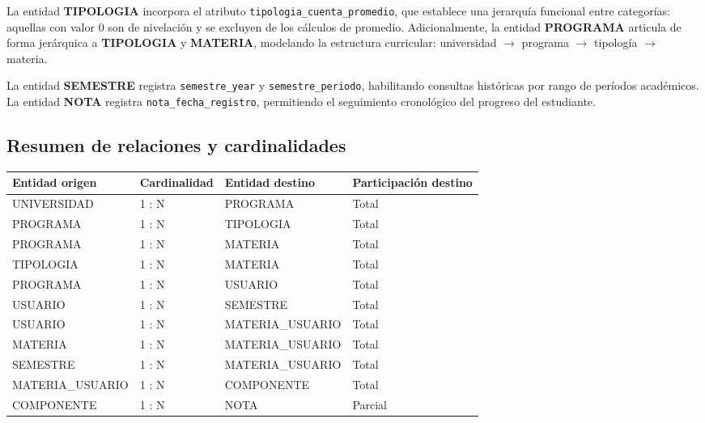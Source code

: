 \documentclass[12pt, letterpaper, twoside]{article}
\begin{document}
La entidad \textbf{TIPOLOGIA} incorpora el atributo \texttt{tipologia\_cuenta\_promedio},
que establece una jerarquía funcional entre categorías: aquellas con valor 0 son de
nivelación y se excluyen de los cálculos de promedio. Adicionalmente, la entidad
\textbf{PROGRAMA} articula de forma jerárquica a \textbf{TIPOLOGIA} y \textbf{MATERIA},
modelando la estructura curricular: universidad $\rightarrow$ programa $\rightarrow$
tipología $\rightarrow$ materia.

La entidad \textbf{SEMESTRE} registra \texttt{semestre\_year} y \texttt{semestre\_periodo},
habilitando consultas históricas por rango de períodos académicos. La entidad
\textbf{NOTA} registra \texttt{nota\_fecha\_registro}, permitiendo el seguimiento
cronológico del progreso del estudiante.

\subsection{Resumen de relaciones y cardinalidades}

\begin{center}
\begin{tabular}{llll}
\toprule
\textbf{Entidad origen} & \textbf{Cardinalidad} & \textbf{Entidad destino} & \textbf{Participación destino} \\
\midrule
UNIVERSIDAD      & 1 : N & PROGRAMA         & Total \\
PROGRAMA         & 1 : N & TIPOLOGIA        & Total \\
PROGRAMA         & 1 : N & MATERIA          & Total \\
TIPOLOGIA        & 1 : N & MATERIA          & Total \\
PROGRAMA         & 1 : N & USUARIO          & Total \\
USUARIO          & 1 : N & SEMESTRE         & Total \\
USUARIO          & 1 : N & MATERIA\_USUARIO  & Total \\
MATERIA          & 1 : N & MATERIA\_USUARIO  & Total \\
SEMESTRE         & 1 : N & MATERIA\_USUARIO  & Total \\
MATERIA\_USUARIO & 1 : N & COMPONENTE       & Total \\
COMPONENTE       & 1 : N & NOTA             & Parcial \\
\bottomrule
\end{tabular}
\end{center}

\end{document}
